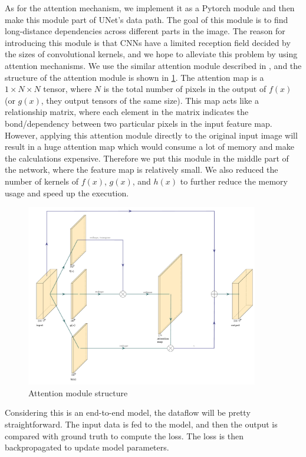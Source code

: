 \documentclass[12pt]{article}
\begin{document}
As for the attention mechanism, we implement it as a Pytorch module and then make this module
part of UNet's data path. The goal of this module is to find long-distance dependencies across different parts in the image. The reason for introducing this module is that CNNs have a limited
reception field decided by the sizes of convolutional kernels, and we hope to alleviate this problem
by using attention mechanisms. We use the similar attention module described in
\cite{zhangSelfAttentionGenerativeAdversarial2019a}, and the structure of the attention module is shown in
\ref{img:attention}. The attention map is a $1 \times N \times N$ tensor, where $N$ is the total number of
pixels in the output of $f(x)$ (or $g(x)$, they output tensors of the same size). This map acts like a
relationship matrix, where each element in the matrix indicates the bond/dependency between two particular
pixels in the input feature map. However, applying this attention module directly to the original input
image will result in a huge attention map which would consume a lot of memory and make the calculations
expensive. Therefore we put this module in the middle part of the network, where the feature map is relatively
small. We also reduced the number of kernels of $f(x)$, $g(x)$, and $h(x)$ to further reduce the memory
usage and speed up the execution.

\begin{figure}[!h]
    \centering
    \includegraphics[width=4in]{imgs/attention.pdf}
    \caption{Attention module structure}
    \label{img:attention}
\end{figure}


Considering this is an end-to-end model, the dataflow will be pretty straightforward. The input data is fed to the model,
and then the output is compared with ground truth to compute the loss. The loss is then backpropagated to update model parameters.
\end{document}

